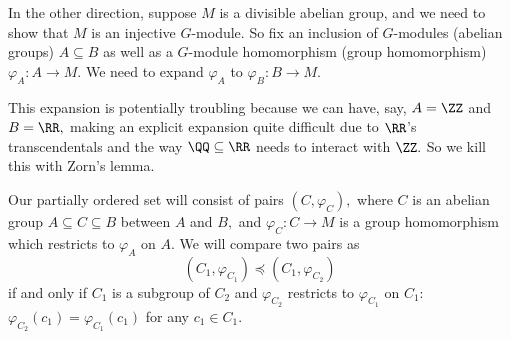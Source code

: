 In the other direction, suppose $M$ is a divisible abelian group, and we need to show that $M$ is an injective $G$-module. So fix an inclusion of $G$-modules (abelian groups) $A\subseteq B$ as well as a $G$-module homomorphism (group homomorphism) $\varphi_A:A\to M.$ We need to expand $\varphi_A$ to $\varphi_B:B\to M.$

This expansion is potentially troubling because we can have, say, $A=\ZZ$ and $B=\RR,$ making an explicit expansion quite difficult due to $\RR$'s transcendentals and the way $\QQ\subseteq\RR$ needs to interact with $\ZZ.$ So we kill this with Zorn's lemma.

Our partially ordered set will consist of pairs $(C,\varphi_C),$ where $C$ is an abelian group $A\subseteq C\subseteq B$ between $A$ and $B,$ and $\varphi_C:C\to M$ is a group homomorphism which restricts to $\varphi_A$ on $A.$ We will compare two pairs as
\[(C_1,\varphi_{C_1})\preceq(C_1,\varphi_{C_2})\]
if and only if $C_1$ is a subgroup of $C_2$ and $\varphi_{C_2}$ restricts to $\varphi_{C_1}$ on $C_1$: $\varphi_{C_2}(c_1)=\varphi_{C_1}(c_1)$ for any $c_1\in C_1.$

